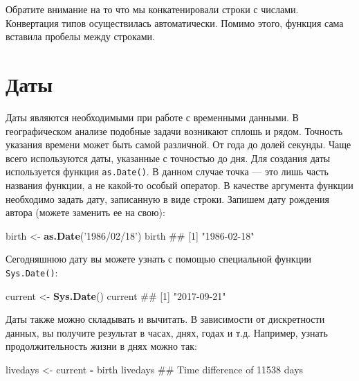 \documentclass[]{book}
\newenvironment{Shaded}{\begin{snugshade}}{\end{snugshade}}
\newcommand{\KeywordTok}[1]{\textcolor[rgb]{0.13,0.29,0.53}{\textbf{#1}}}
\newcommand{\StringTok}[1]{\textcolor[rgb]{0.31,0.60,0.02}{#1}}
\newcommand{\OperatorTok}[1]{\textcolor[rgb]{0.81,0.36,0.00}{\textbf{#1}}}
\newcommand{\NormalTok}[1]{#1}
\begin{document}
Обратите внимание на то что мы конкатенировали строки с числами.
Конвертация типов осуществилась автоматически. Помимо этого, функция
сама вставила пробелы между строками.

\section{Даты}

Даты являются необходимыми при работе с временными данными. В
географическом анализе подобные задачи возникают сплошь и рядом.
Точность указания времени может быть самой различной. От года до долей
секунды. Чаще всего используются даты, указанные с точностью до дня. Для
создания даты используется функция \texttt{as.Date()}. В данном случае
точка --- это лишь часть названия функции, а не какой-то особый
оператор. В качестве аргумента функции необходимо задать дату,
записанную в виде строки. Запишем дату рождения автора (можете заменить
ее на свою):

\begin{Shaded}
\begin{Highlighting}[]
\NormalTok{birth <-}\StringTok{ }\KeywordTok{as.Date}\NormalTok{(}\StringTok{'1986/02/18'}\NormalTok{)}
\NormalTok{birth}
\NormalTok{## [1] "1986-02-18"}
\end{Highlighting}
\end{Shaded}

Сегодняшнюю дату вы можете узнать с помощью специальной функции
\texttt{Sys.Date()}:

\begin{Shaded}
\begin{Highlighting}[]
\NormalTok{current <-}\StringTok{ }\KeywordTok{Sys.Date}\NormalTok{()}
\NormalTok{current}
\NormalTok{## [1] "2017-09-21"}
\end{Highlighting}
\end{Shaded}

Даты также можно складывать и вычитать. В зависимости от дискретности
данных, вы получите результат в часах, днях, годах и т.д. Например,
узнать продолжительность жизни в днях можно так:

\begin{Shaded}
\begin{Highlighting}[]
\NormalTok{livedays <-}\StringTok{ }\NormalTok{current }\OperatorTok{-}\StringTok{ }\NormalTok{birth}
\NormalTok{livedays}
\NormalTok{## Time difference of 11538 days}
\end{Highlighting}
\end{Shaded}
\end{document}
